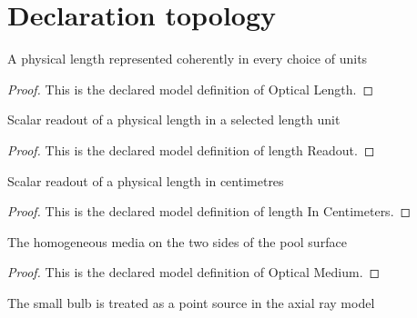 \section{Declaration topology}
\begin{definition}
  \label{def:physics:phyx-mini-0161:phyxminiproblems-problemphyxmini0161-opticallength}
  A physical length represented coherently in every choice of units
\end{definition}
\begin{proof}
  This is the declared model definition of Optical Length.
\end{proof}
\begin{definition}
  \label{def:physics:phyx-mini-0161:phyxminiproblems-problemphyxmini0161-lengthreadout}
  Scalar readout of a physical length in a selected length unit
\end{definition}
\begin{proof}
  This is the declared model definition of length Readout.
\end{proof}
\begin{definition}
  \label{def:physics:phyx-mini-0161:phyxminiproblems-problemphyxmini0161-lengthincentimeters}
  Scalar readout of a physical length in centimetres
\end{definition}
\begin{proof}
  This is the declared model definition of length In Centimeters.
\end{proof}
\begin{definition}
  \label{def:physics:phyx-mini-0161:phyxminiproblems-problemphyxmini0161-opticalmedium}
  The homogeneous media on the two sides of the pool surface
\end{definition}
\begin{proof}
  This is the declared model definition of Optical Medium.
\end{proof}
\begin{definition}
  \label{def:physics:phyx-mini-0161:phyxminiproblems-problemphyxmini0161-sourcemodel}
  The small bulb is treated as a point source in the axial ray model
\end{definition}
